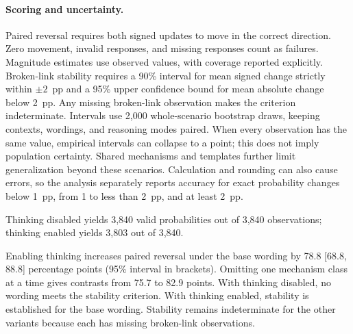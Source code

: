 \clearpage
\paragraph{Scoring and uncertainty.}
Paired reversal requires both signed updates to move in the correct direction.
Zero movement, invalid responses, and missing responses count as failures.
Magnitude estimates use observed values, with coverage reported explicitly.
Broken-link stability requires a 90\% interval for mean signed change strictly
within $\pm2$~pp and a 95\% upper confidence bound for mean absolute change below
2~pp. Any missing broken-link observation makes the criterion indeterminate.
Intervals use 2,000 whole-scenario bootstrap draws, keeping contexts, wordings,
and reasoning modes paired. When every observation has the same value, empirical
intervals can collapse to a point; this does not imply population certainty.
Shared mechanisms and templates further limit generalization beyond these
scenarios. Calculation and rounding can also cause errors, so the analysis
separately reports accuracy for exact probability changes below 1~pp, from 1 to
less than 2~pp, and at least 2~pp.

Thinking disabled yields 3,840 valid probabilities out of 3,840 observations; thinking enabled yields 3,803 out of 3,840.

\begin{center}
\begin{minipage}{\linewidth}
\centering
{}
\label{tab:exp1-fresh-performance}
\small

\end{minipage}
\end{center}

Enabling thinking increases paired reversal under the base wording by 78.8 [68.8, 88.8] percentage points (95\% interval in brackets). Omitting one mechanism class at a time gives contrasts from 75.7 to 82.9 points. With thinking disabled, no wording meets the stability criterion. With thinking enabled, stability is established for the base wording. Stability remains indeterminate for the other variants because each has missing broken-link observations.

